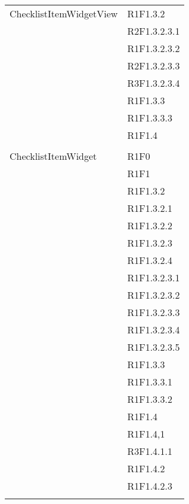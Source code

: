 \begin{center}
\begin{longtable}{|p{7cm}|p{7cm}|}
		ChecklistItemWidgetView & R1F1.3.2 \\ & R2F1.3.2.3.1 \\ & R1F1.3.2.3.2 \\ & R2F1.3.2.3.3 \\ & R3F1.3.2.3.4 \\ & R1F1.3.3 \\ & R1F1.3.3.3 \\ & R1F1.4 \\ & \\ \hline
		ChecklistItemWidget & R1F0 \\ & R1F1 \\ & R1F1.3.2 \\ & R1F1.3.2.1 \\ & R1F1.3.2.2 \\ & R1F1.3.2.3 \\ & R1F1.3.2.4 \\ & R1F1.3.2.3.1 \\ & R1F1.3.2.3.2 \\ & R1F1.3.2.3.3 \\ & R1F1.3.2.3.4 \\ & R1F1.3.2.3.5 \\ & R1F1.3.3 \\ & R1F1.3.3.1 \\ & R1F1.3.3.2 \\ & R1F1.4 \\ & R1F1.4,1 \\ & R3F1.4.1.1 \\ & R1F1.4.2 \\ & R1F1.4.2.3 \\ & \\ \hline

\end{longtable}
\end{center}
